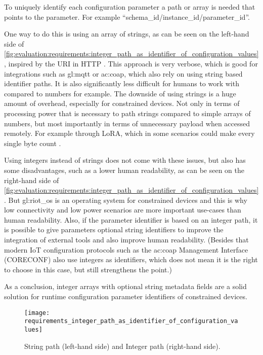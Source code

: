 To uniquely identify each configuration parameter a path or array is needed that points to the parameter.
For example ``schema\_id/instance\_id/parameter\_id''.

One way to do this is using an array of strings, as can be seen on the left-hand side of \autoref{fig:evaluation:requirements:integer_path_as_identifier_of_configuration_values}, inspired by the URI in HTTP \cite{RFC-3986}.
This approach is very verbose, which is good for integrations such as \gls{gl:mqtt} \cite{mqtt311} or \gls{ac:coap}, which also rely on using string based identifier paths.
It is also significantly less difficult for humans to work with compared to numbers for example.
The downside of using strings is a huge amount of overhead, especially for constrained devices.
Not only in terms of processing power that is necessary to path strings compared to simple arrays of numbers, but most importantly in terms of unnecessary payload when accessed remotely.
For example through LoRA, which in some scenarios could make every single byte count \cite{avtms-ull-17}.

Using integers instead of strings does not come with these issues, but also has some disadvantages, such as a lower human readability, as can be seen on the right-hand side of \autoref{fig:evaluation:requirements:integer_path_as_identifier_of_configuration_values}.
But \gls{gl:riot_os} is an operating system for constrained devices and this is why low connectivity and low power scenarios are more important use-cases than human readability.
Also, if the parameter identifier is based on an integer path, it is possible to give parameters optional string identifiers to improve the integration of external tools and also improve human readability.
(Besides that modern IoT configuration protocols such as the \gls{ac:coap} Management Interface (CORECONF) \cite{draft-ietf-core-comi-11} also use integers as identifiers, which does not mean it is the right to choose in this case, but still strengthens the point.)

As a conclusion, integer arrays with optional string metadata fields are a solid solution for runtime configuration parameter identifiers of constrained devices.

\begin{figure}[H]
    \centering
    \texttt{[image: requirements\_integer\_path\_as\_identifier\_of\_configuration\_values]}
    \caption{String path (left-hand side) and Integer path (right-hand side).}
    \label{fig:evaluation:requirements:integer_path_as_identifier_of_configuration_values}
\end{figure}


